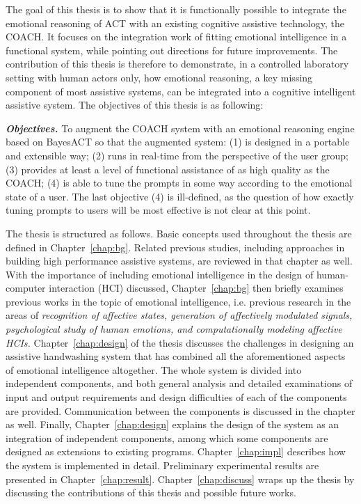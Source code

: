 The goal of this thesis is to show that it is functionally possible to integrate the emotional reasoning of ACT with an existing cognitive assistive technology, the COACH. It focuses on the integration work of fitting emotional intelligence in a functional system, while pointing out directions for future improvements. The contribution of this thesis is therefore to demonstrate, in a controlled laboratory setting with human actors only, how emotional reasoning, a key missing component of most assistive systems, can be integrated into a cognitive intelligent assistive system. The objectives of this thesis is as following:

\textbf{\textit{Objectives.}} To augment the COACH system with an emotional reasoning engine based on BayesACT so that the augmented system: (1) is designed in a portable and extensible way; (2) runs in real-time from the perspective of the user group; (3) provides at least a level of functional assistance of as high quality as the COACH; (4) is able to tune the prompts in some way according to the emotional state of a user. The last objective (4) is ill-defined, as the question of how exactly tuning prompts to users will be most effective is not clear at this point.

The thesis is structured as follows. Basic concepts used throughout the thesis are defined in Chapter~\ref{chap:bg}. Related previous studies, including approaches in building high performance assistive systems, are reviewed in that chapter as well. With the importance of including emotional intelligence in the design of human-computer interaction (HCI) discussed, Chapter~\ref{chap:bg} then briefly examines previous works in the topic of emotional intelligence, i.e. previous research in the areas of \textit{recognition of affective states, generation of affectively modulated signals, psychological study of human emotions, and computationally modeling affective HCIs.} Chapter~\ref{chap:design} of the thesis discusses the challenges in designing an assistive handwashing system that has combined all the aforementioned aspects of emotional intelligence altogether. The whole system is divided into independent components, and both general analysis and detailed examinations of input and output requirements and design difficulties of each of the components are provided. Communication between the components is discussed in the chapter as well. Finally, Chapter~\ref{chap:design} explains the design of the system as an integration of independent components, among which some components are designed as extensions to existing programs. Chapter~\ref{chap:impl} describes how the system is implemented in detail. Preliminary experimental results are presented in Chapter~\ref{chap:result}. Chapter~\ref{chap:discuss} wraps up the thesis by discussing the contributions of this thesis and possible future works.
